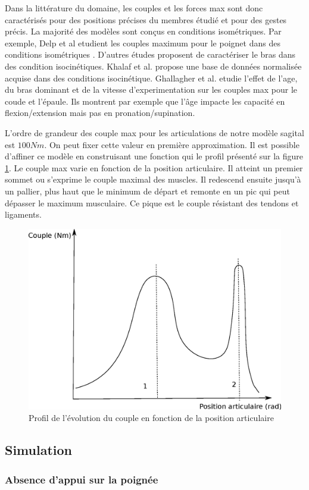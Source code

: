 \documentclass[a4paper, 10pt ]{article}
\begin{document}
Dans la littérature du domaine, les couples et les forces max sont donc caractérisés pour des positions précises du membres étudié et pour des gestes précis. La majorité des modèles sont conçus en conditions isométriques. Par exemple, Delp et al etudient les couples maximum pour le poignet dans des conditions isométriques \cite{delp1996}. D'autres études proposent de caractériser le bras dans des condition isocinétiques. Khalaf et al. \cite{Khalaf2001} propose une base de données normalisée acquise dans des conditions isocinétique. Ghallagher et al. \cite{gallagher1996,gallagher1997} etudie l'effet de l'age, du bras dominant et de la vitesse d'experimentation sur les couples max pour le coude et l'épaule. Ils montrent par exemple que l'âge impacte les capacité en flexion/extension mais pas en pronation/supination.


L'ordre de grandeur des couple max pour les articulations de notre modèle sagital est $100Nm$. On peut fixer cette valeur en première approximation. Il est possible d'affiner ce modèle en construisant une fonction qui le profil présenté sur la figure \ref{fig:profilcouple}. Le couple max varie en fonction de la position articulaire. Il atteint un premier sommet ou s'exprime le couple maximal des muscles. Il redescend ensuite jusqu'à un pallier, plus haut que le minimum de départ et remonte en un pic qui peut dépasser le maximum musculaire. Ce pique est le couple résistant des tendons et ligaments.

\begin{figure}[h]
\centering
\includegraphics[width=0.5\columnwidth]{images/model/couples.eps}
\caption{Profil de l'évolution du couple en fonction de la position articulaire}
\label{fig:profilcouple}
\end{figure}


\subsection{Simulation}

\subsubsection{Absence d'appui sur la poignée }
\end{document}
